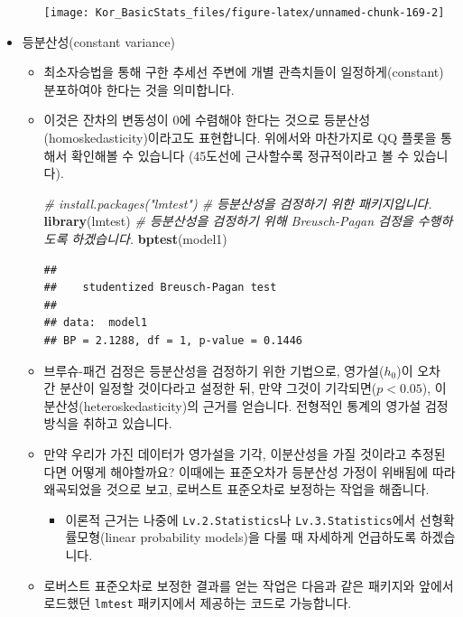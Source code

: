 \documentclass[]{book}
\newenvironment{Shaded}{\begin{snugshade}}{\end{snugshade}}
\newcommand{\CommentTok}[1]{\textcolor[rgb]{0.56,0.35,0.01}{\textit{#1}}}
\newcommand{\KeywordTok}[1]{\textcolor[rgb]{0.13,0.29,0.53}{\textbf{#1}}}
\newcommand{\NormalTok}[1]{#1}
\providecommand{\tightlist}{%
  \setlength{\itemsep}{0pt}\setlength{\parskip}{0pt}}
\begin{document}
\begin{itemize}
\begin{itemize}
    \begin{center}\texttt{[image: Kor\_BasicStats\_files/figure-latex/unnamed-chunk-169-2]} \end{center}
  \end{itemize}
\item
  등분산성(constant variance)

  \begin{itemize}
  \item
    최소자승법을 통해 구한 추세선 주변에 개별 관측치들이 일정하게(constant) 분포하여야 한다는 것을 의미합니다.
  \item
    이것은 잔차의 변동성이 0에 수렴해야 한다는 것으로 등분산성(homoskedasticity)이라고도 표현합니다. 위에서와 마찬가지로 QQ 플롯을 통해서 확인해볼 수 있습니다 (45도선에 근사할수록 정규적이라고 볼 수 있습니다).

\begin{Shaded}
\begin{Highlighting}[]
\CommentTok{# install.packages("lmtest") # 등분산성을 검정하기 위한 패키지입니다.}
\KeywordTok{library}\NormalTok{(lmtest)}
\CommentTok{# 등분산성을 검정하기 위해 Breusch-Pagan 검정을 수행하도록 하겠습니다.}
\KeywordTok{bptest}\NormalTok{(model1)}
\end{Highlighting}
\end{Shaded}

\begin{verbatim}
## 
##    studentized Breusch-Pagan test
## 
## data:  model1
## BP = 2.1288, df = 1, p-value = 0.1446
\end{verbatim}
  \item
    브루슈-패건 검정은 등분산성을 검정하기 위한 기법으로, 영가설(\(h_0\))이 오차 간 분산이 일정할 것이다라고 설정한 뒤, 만약 그것이 기각되면(\(p < 0.05\)), 이분산성(heteroskedasticity)의 근거를 얻습니다. 전형적인 통계의 영가설 검정 방식을 취하고 있습니다.
  \item
    만약 우리가 가진 데이터가 영가설을 기각, 이분산성을 가질 것이라고 추정된다면 어떻게 해야할까요? 이때에는 표준오차가 등분산성 가정이 위배됨에 따라 왜곡되었을 것으로 보고, 로버스트 표준오차로 보정하는 작업을 해줍니다.

    \begin{itemize}
    \tightlist
    \item
      이론적 근거는 나중에 \texttt{Lv.2.Statistics}나 \texttt{Lv.3.Statistics}에서 선형확률모형(linear probability models)을 다룰 때 자세하게 언급하도록 하겠습니다.
    \end{itemize}
  \item
    로버스트 표준오차로 보정한 결과를 얻는 작업은 다음과 같은 패키지와 앞에서 로드했던 \texttt{lmtest} 패키지에서 제공하는 코드로 가능합니다.


\end{itemize}
\end{itemize}
\end{document}
